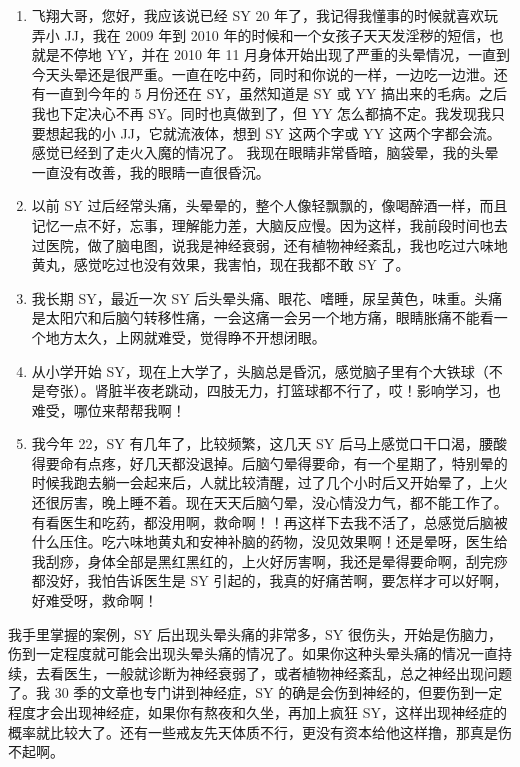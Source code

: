 \documentclass{ctexart}
\begin{document}
\begin{enumerate}
    \item 飞翔大哥，您好，我应该说已经 SY 20 年了，我记得我懂事的时候就喜欢玩弄小 JJ，我在 2009 年到 2010 年的时候和一个女孩子天天发淫秽的短信，也就是不停地 YY，并在 2010 年 11 月身体开始出现了严重的头晕情况，一直到今天头晕还是很严重。一直在吃中药，同时和你说的一样，一边吃一边泄。还有一直到今年的 5 月份还在 SY，虽然知道是 SY 或 YY 搞出来的毛病。之后我也下定决心不再 SY。同时也真做到了，但 YY 怎么都搞不定。我发现我只要想起我的小 JJ，它就流液体，想到 SY 这两个字或 YY 这两个字都会流。感觉已经到了走火入魔的情况了。 我现在眼睛非常昏暗，脑袋晕，我的头晕一直没有改善，我的眼睛一直很昏沉。
    \item 以前 SY 过后经常头痛，头晕晕的，整个人像轻飘飘的，像喝醉酒一样，而且记忆一点不好，忘事，理解能力差，大脑反应慢。因为这样，我前段时间也去过医院，做了脑电图，说我是神经衰弱，还有植物神经紊乱，我也吃过六味地黄丸，感觉吃过也没有效果，我害怕，现在我都不敢 SY 了。
    \item 我长期 SY，最近一次 SY 后头晕头痛、眼花、嗜睡，尿呈黄色，味重。头痛是太阳穴和后脑勺转移性痛，一会这痛一会另一个地方痛，眼睛胀痛不能看一个地方太久，上网就难受，觉得睁不开想闭眼。
    \item 从小学开始 SY，现在上大学了，头脑总是昏沉，感觉脑子里有个大铁球（不是夸张）。肾脏半夜老跳动，四肢无力，打篮球都不行了，哎！影响学习，也难受，哪位来帮帮我啊！
    \item 我今年 22，SY 有几年了，比较频繁，这几天 SY 后马上感觉口干口渴，腰酸得要命有点疼，好几天都没退掉。后脑勺晕得要命，有一个星期了，特别晕的时候我跑去躺一会起来后，人就比较清醒，过了几个小时后又开始晕了，上火还很厉害，晚上睡不着。现在天天后脑勺晕，没心情没力气，都不能工作了。有看医生和吃药，都没用啊，救命啊！！再这样下去我不活了，总感觉后脑被什么压住。吃六味地黄丸和安神补脑的药物，没见效果啊！还是晕呀，医生给我刮痧，身体全部是黑红黑红的，上火好厉害啊，我还是晕得要命啊，刮完痧都没好，我怕告诉医生是 SY 引起的，我真的好痛苦啊，要怎样才可以好啊，好难受呀，救命啊！
\end{enumerate}

我手里掌握的案例，SY 后出现头晕头痛的非常多，SY 很伤头，开始是伤脑力，伤到一定程度就可能会出现头晕头痛的情况了。如果你这种头晕头痛的情况一直持续，去看医生，一般就诊断为神经衰弱了，或者植物神经紊乱，总之神经出现问题了。我 30 季的文章也专门讲到神经症，SY 的确是会伤到神经的，但要伤到一定程度才会出现神经症，如果你有熬夜和久坐，再加上疯狂 SY，这样出现神经症的概率就比较大了。还有一些戒友先天体质不行，更没有资本给他这样撸，那真是伤不起啊。
\end{document}
